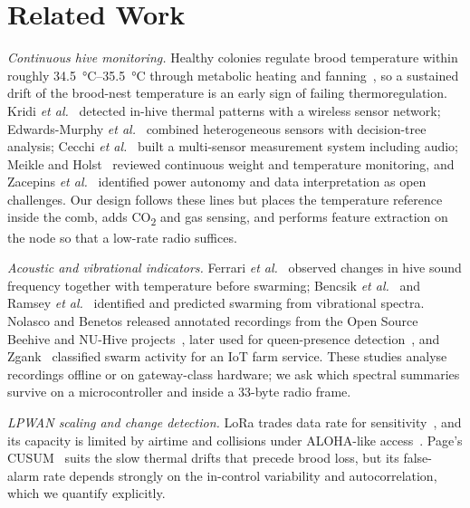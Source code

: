 \documentclass[conference]{IEEEtran}
\newcommand{\COtwo}{CO\textsubscript{2}}
\begin{document}
\section{Related Work}\label{sec:related}
\textit{Continuous hive monitoring.} Healthy colonies regulate brood temperature within roughly \SIrange{34.5}{35.5}{\celsius} through metabolic heating and fanning~\cite{southwick1987,seeley1985}, so a sustained drift of the brood-nest temperature is an early sign of failing thermoregulation. Kridi \textit{et al.}~\cite{kridi2016} detected in-hive thermal patterns with a wireless sensor network; Edwards-Murphy \textit{et al.}~\cite{edwardsmurphy2016} combined heterogeneous sensors with decision-tree analysis; Cecchi \textit{et al.}~\cite{cecchi2020} built a multi-sensor measurement system including audio; Meikle and Holst~\cite{meikle2015} reviewed continuous weight and temperature monitoring, and Zacepins \textit{et al.}~\cite{zacepins2015} identified power autonomy and data interpretation as open challenges. Our design follows these lines but places the temperature reference inside the comb, adds \COtwo{} and gas sensing, and performs feature extraction on the node so that a low-rate radio suffices.

\textit{Acoustic and vibrational indicators.} Ferrari \textit{et al.}~\cite{ferrari2008} observed changes in hive sound frequency together with temperature before swarming; Bencsik \textit{et al.}~\cite{bencsik2011} and Ramsey \textit{et al.}~\cite{ramsey2020} identified and predicted swarming from vibrational spectra. Nolasco and Benetos released annotated recordings from the Open Source Beehive and NU-Hive projects~\cite{nolasco2018,nolasco2018data}, later used for queen-presence detection~\cite{ruvinga2023}, and Zgank~\cite{zgank2020} classified swarm activity for an IoT farm service. These studies analyse recordings offline or on gateway-class hardware; we ask which spectral summaries survive on a microcontroller and inside a 33-byte radio frame.

\textit{LPWAN scaling and change detection.} LoRa trades data rate for sensitivity~\cite{augustin2016,semtech2013an}, and its capacity is limited by airtime and collisions under ALOHA-like access~\cite{abramson1970,bor2016,adelantado2017}. Page's CUSUM~\cite{page1954,montgomery2013} suits the slow thermal drifts that precede brood loss, but its false-alarm rate depends strongly on the in-control variability and autocorrelation, which we quantify explicitly.
\end{document}
